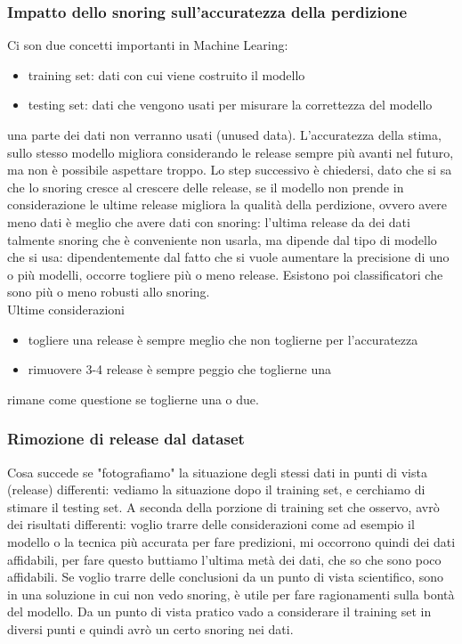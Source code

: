 \documentclass{article}
\begin{document}
\subsubsection{Impatto dello snoring sull'accuratezza della perdizione}
Ci son due concetti importanti in Machine Learing:
\begin{itemize}
\item training set: dati con cui viene costruito il modello
\item testing set: dati che vengono usati per misurare la correttezza del modello
\end{itemize}
una parte dei dati non verranno usati (unused data). L'accuratezza della stima, sullo stesso modello migliora considerando le release sempre più avanti nel futuro, ma non è possibile aspettare troppo. Lo step successivo è chiedersi, dato che si sa che lo snoring cresce al crescere delle release, se il modello non prende in considerazione le ultime release migliora la qualità della perdizione, ovvero avere meno dati è meglio che avere dati con snoring: l'ultima release da dei dati talmente snoring che è conveniente non usarla, ma dipende dal tipo di modello che si usa: dipendentemente dal fatto che si vuole aumentare la precisione di uno o più modelli, occorre togliere più o meno release. Esistono poi classificatori che sono più o meno robusti allo snoring.\\ Ultime considerazioni
\begin{itemize}
\item togliere una release è sempre meglio che non toglierne per l'accuratezza
\item rimuovere 3-4 release è sempre peggio che toglierne una
\end{itemize}
rimane come questione se toglierne una o due.
\subsubsection{Rimozione di release dal dataset}
Cosa succede se "fotografiamo" la situazione degli stessi dati in punti di vista (release) differenti: vediamo la situazione dopo il training set, e cerchiamo di stimare il testing set. A seconda della porzione di training set che osservo, avrò dei risultati differenti: voglio trarre delle considerazioni come ad esempio il modello o la tecnica più accurata per fare predizioni, mi occorrono quindi dei dati affidabili, per fare questo buttiamo l'ultima metà dei dati, che so che sono poco affidabili. Se voglio trarre delle conclusioni da un punto di vista scientifico, sono in una soluzione in cui non vedo snoring, è utile per fare ragionamenti sulla bontà del modello. Da un punto di vista pratico vado a considerare il training set in diversi punti  e quindi avrò un certo snoring nei dati.
\end{document}
